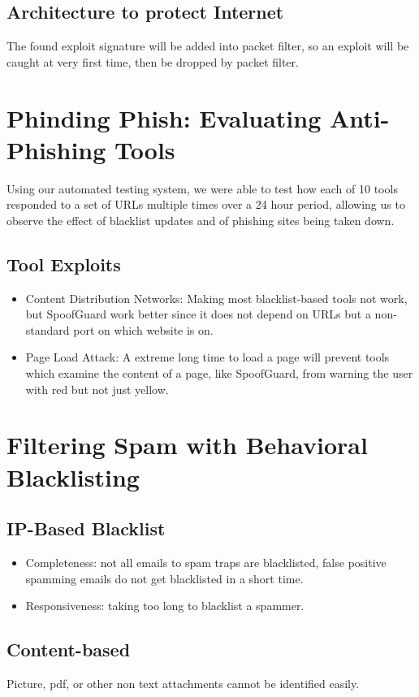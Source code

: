 \documentclass[]{article}
\begin{document}
\subsection{Architecture to protect Internet}
The found exploit signature will be added into packet filter, so an 
exploit will be caught at very first time, then be dropped by packet
filter.

\section{Phinding Phish: Evaluating Anti-Phishing Tools}
 Using our automated testing system, we were able to test how each 
 of 10 tools responded to a set of URLs multiple times over a 24 hour 
 period, allowing us to observe the effect of blacklist updates and 
 of phishing sites being taken down.

\subsection{Tool Exploits}
\begin{itemize}
 \item Content Distribution Networks: Making most blacklist-based
 tools not work, but SpoofGuard work better since it does not depend
 on URLs but a non-standard port on which website is on.
 \item Page Load Attack: A extreme long time to load a page will
 prevent tools which examine the content of a page, like SpoofGuard,
 from warning the user with red but not just yellow.
\end{itemize}


\section{Filtering Spam with Behavioral Blacklisting}

\subsection{IP-Based Blacklist}
\begin{itemize}
 \item Completeness: not all emails to spam traps are blacklisted, 
 false positive spamming emails do not get blacklisted in a short time.
 \item Responsiveness: taking too long to blacklist a spammer.
\end{itemize}

\subsection{Content-based}
Picture, pdf, or other non text attachments cannot be identified 
easily.
\end{document}
